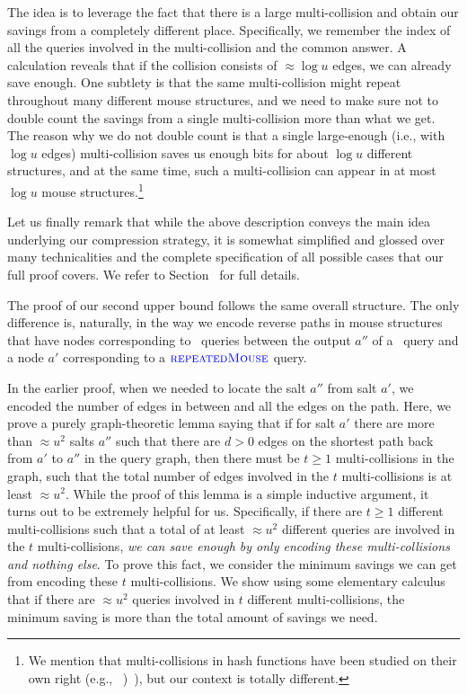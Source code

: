 The idea is to leverage the fact that there is a large multi-collision and obtain our savings from a completely different place. Specifically,
we remember the index of all the queries involved in the multi-collision and the common answer. A calculation reveals that if the collision consists of $\approx \log u$ edges, we can already save enough. 
One subtlety is that the same multi-collision might repeat throughout many different mouse structures, and we need to make sure not to double count the savings from a single multi-collision more than what we get. The reason why we do not double count is that a single large-enough (i.e.,  with $\log u$ edges) multi-collision saves us enough bits for about $\log u$ different structures, and at the same time, such a multi-collision can appear in at most  $\log u$ mouse structures.\footnote{We mention that multi-collisions in hash functions have been studied on their own right (e.g.,\ifnum{} ~\cite{Joux04,BermanDRV18,BitanskyKP18,KomargodskiNY18,Dinur20})\else~\cite{Joux04,Dinur20})\fi, but our context is totally different.}

Let us finally remark that while the above description conveys the main idea underlying our compression strategy, it is somewhat simplified and glossed over many technicalities and the complete specification of all possible cases that our full proof covers. We refer to Section~ for full details.


 The proof of our second upper bound follows the same overall structure. The only difference is, naturally, in the way we encode reverse paths in mouse structures that have nodes corresponding to \urep\ queries between the output $a''$ of a \new\ query and a  node $a'$ corresponding to a ${\color{blue} \textsc{repeatedMouse}}$ query.

In the earlier proof, when we needed to locate the salt $a''$ from salt $a'$, we encoded the number of edges in between and all the edges on the path. Here, we prove a purely graph-theoretic lemma saying that if for salt $a'$ there are more than $\approx u^2$ salts $a''$ such that there are $d>0$ edges on the shortest path back from $a'$ to $a''$ in the query graph, then there must be $t\geq 1$ multi-collisions in the graph, such that the total number of edges involved in the $t$ multi-collisions is at least $\approx u^2$. While the proof of this lemma is a simple inductive argument, it turns out to be extremely helpful for us. Specifically, if there are $t\geq 1$ different multi-collisions such that a total of at least $\approx u^2$ different queries are involved in the $t$ multi-collisions, \emph{we can save enough by only encoding these multi-collisions and nothing else}. To prove this fact, we consider the minimum savings we can get from encoding these $t$ multi-collisions. We show using some elementary calculus that if there are $\approx u^2$ queries involved in $t$ different multi-collisions, the minimum saving is more than the total amount of savings we need.

